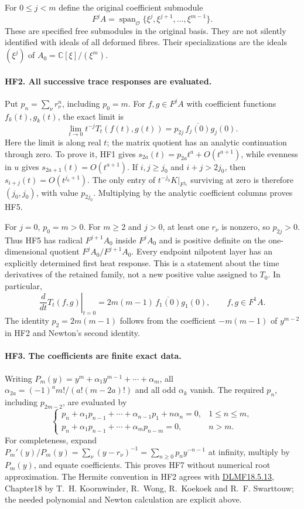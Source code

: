 For $0\le j<m$ define the original coefficient submodule
\[
 F^jA=\operatorname{span}_{\mathcal O}
          \{\xi^j,\xi^{j+1},\ldots,\xi^{m-1}\}.
 \tag{HF4}
\]
These are specified free submodules in the original basis. They
are not silently identified with ideals of all deformed fibres.
Their specializations are the ideals $(\xi^j)$ of
$A_0=\mathbb C[\xi]/(\xi^m)$.

\paragraph{HF2. All successive trace responses are evaluated.}
Put $p_n=\sum_\nu r_\nu^n$, including $p_0=m$. For $f,g\in F^jA$
with coefficient functions $f_k(t),g_k(t)$, the exact limit is
\[
 \boxed{\lim_{t\to0}t^{-j}T_t(f(t),g(t))
       =p_{2j}\,\overline{f_j(0)}g_j(0).}
 \tag{HF5}
\]
Here the limit is along real $t$; the matrix quotient has an analytic
continuation through zero. To prove it, HF1 gives
$s_{2a}(t)=p_{2a}t^a+O(t^{a+1})$, while evenness in $u$ gives
$s_{2a+1}(t)=O(t^{a+1})$. If $i,j\ge j_0$ and
$i+j>2j_0$, then $s_{i+j}(t)=O(t^{j_0+1})$.
The only entry of $t^{-j_0}K|_{F^{j_0}}$ surviving at zero is
therefore $(j_0,j_0)$, with value $p_{2j_0}$. Multiplying by the
analytic coefficient columns proves HF5.

For $j=0$, $p_0=m>0$. For $m\ge2$ and $j>0$, at least one
$r_\nu$ is nonzero, so $p_{2j}>0$. Thus HF5 has radical
$F^{j+1}A_0$ inside $F^jA_0$ and is positive definite on the
one-dimensional quotient $F^jA_0/F^{j+1}A_0$.
Every endpoint nilpotent layer has an explicitly determined
first heat response. This is a statement about the time derivatives
of the retained family, not a new positive value assigned to $T_0$.
In particular,
\[
 \left.\frac d{dt}T_t(f,g)\right|_{t=0}
    =2m(m-1)\,\overline{f_1(0)}g_1(0),
       \qquad f,g\in F^1A.
 \tag{HF6}
\]
The identity $p_2=2m(m-1)$ follows from the coefficient
$-m(m-1)$ of $y^{m-2}$ in HF2 and Newton's second identity.

\paragraph{HF3. The coefficients are finite exact data.}
Writing $P_m(y)=y^m+\alpha_1y^{m-1}+\cdots+\alpha_m$, all
$\alpha_{2a}=(-1)^a m!/(a!(m-2a)!)$ and all odd $\alpha_k$ vanish.
The required $p_n$, including $p_{2m-2}$, are evaluated by
\[
 \begin{cases}
 p_n+\alpha_1p_{n-1}+\cdots+\alpha_{n-1}p_1+n\alpha_n=0,
          &1\le n\le m,\\
 p_n+\alpha_1p_{n-1}+\cdots+\alpha_m p_{n-m}=0,&n>m.
 \end{cases}
 \tag{HF7}
\]
For completeness, expand
$P_m'(y)/P_m(y)=\sum_\nu(y-r_\nu)^{-1}
=\sum_{n\ge0}p_n y^{-n-1}$ at infinity, multiply by $P_m(y)$,
and equate coefficients. This proves HF7 without numerical root
approximation. The Hermite convention in HF2 agrees with
\href{https://dlmf.nist.gov/18.5.E13}{DLMF18.5.13}, Chapter18 by
T.~H. Koornwinder, R.~Wong, R.~Koekoek and R.~F. Swarttouw;
the needed polynomial and Newton calculation are explicit above.

